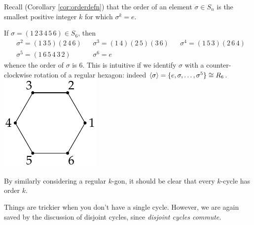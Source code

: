 \vfil


Recall (Corollary \ref{cor:orderdefn}) that the order of an element $\sigma\in S_n$ is the smallest positive integer $k$ for which $\sigma^k=e$.

\begin{example}[lower separated=false, sidebyside, sidebyside align=top seam, sidebyside gap=0pt, righthand width=0.22\linewidth]{}{}
	If $\sigma=(1\,2\,3\,4\,5\,6)\in S_6$, then
	\begin{align*}
		&\sigma^2=(1\,3\,5)(2\,4\,6) &&\sigma^3=(1\,4)(2\,5)(3\,6) &&\sigma^4=(1\,5\,3)(2\,6\,4)\\
		&\sigma^5=(1\,6\,5\,4\,3\,2) &&\sigma^6=e&&
	\end{align*}
	whence the order of $\sigma$ is 6. This is intuitive if we identify $\sigma$ with a counter-clockwise rotation of a regular hexagon: indeed $\left\langle \sigma\right\rangle=\{e,\sigma,\ldots,\sigma^5\} \cong R_6$.
	\tcblower
	\flushright\includegraphics{perm-hexagon}
\end{example}

By similarly considering a regular $k$-gon, it should be clear that every $k$-cycle has order $k$.

\goodbreak

Things are trickier when you don't have a single cycle. However, we are again saved by the discussion of disjoint cycles, since \emph{disjoint cycles commute.}

